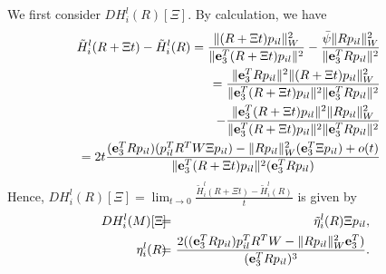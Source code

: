 \documentclass[conference,letterpaper]{ieeeconf}
\begin{document}
We first consider $DH_i^l(R)[\Xi]$.
By calculation, we have
\begin{eqnarray}
\hspace{-.8cm}&&\tilde H^{l}_i(R + \Xi t) - \tilde H^{l}_i(R)=
\frac{ \|(R+\Xi t)p_{il}\|_W^2}{\|{\bf e}_3^T (R+\Xi t) p_{il}\|^2}
- \frac{\bar \psi \|R p_{il}\|_W^2}{\|{\bf e}_3^T R p_{il}\|^2}
\nonumber\\
\hspace{-.8cm}&&\hspace{.2cm}
= \frac{\|{\bf e}_3^T R p_{il}\|^2\|(R+\Xi t)p_{il}\|_W^2}
{\|{\bf e}_3^T (R+\Xi t) p_{il}\|^2\|{\bf e}_3^T R p_{il}\|^2}
\nonumber\\
\hspace{-.8cm}&&\hspace{3.2cm}
- \frac{\|{\bf e}_3^T (R+\Xi t) p_{il}\|^2\|Rp_{il}\|_W^2}
{\|{\bf e}_3^T (R+\Xi t) p_{il}\|^2\|{\bf e}_3^T R p_{il}\|^2}
\nonumber\\
\hspace{-.8cm}&&\hspace{.2cm}
= 2t \frac{({\bf e}_3^T R p_{il})(p_{il}^TR^TW\Xi p_{il})
- \|Rp_{il}\|_W^2 ({\bf e}_3^T\Xi p_{il}) + o(t)}
{\|{\bf e}_3^T (R+\Xi t) p_{il}\|^2({\bf e}_3^T R p_{il})}
\nonumber
\end{eqnarray}
Hence, $D H_i^l(R)[\Xi] = \lim_{t\to 0}\frac{\tilde H^{l}_i(R + \Xi t) - \tilde H^{l}_i(R)}{t}$
is given by
\begin{eqnarray}
D H_i^l(M)[\Xi]
\!\!&\!\!=\!\!&\!\!
\tilde \eta_i^l(R)\Xi p_{il},
\label{eqn:modify2}\\
\eta_i^l(R) \!\!&\!\!=\!\!&\!\! \frac{2(
({\bf e}_3^T R p_{il})p_{il}^TR^TW
- \|Rp_{il}\|_W^2 {\bf e}_3^T
)}{({\bf e}_3^T R p_{il})^3}.
\nonumber
\end{eqnarray}
\end{document}
